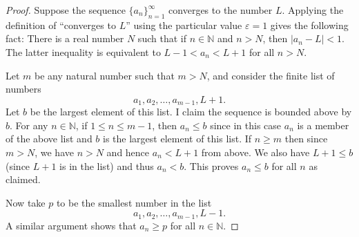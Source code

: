 \documentclass[12pt]{amsart}
\def\e{\varepsilon}
\newcommand{\N}{\mathbb{N}}
\numberwithin{equation}{section}
\theoremstyle{plain} %
\theoremstyle{definition}
\theoremstyle{remark}
\begin{document}
\begin{proof} Suppose the sequence $\{a_n\}_{n=1}^\infty$ converges to
	the number $L$. Applying the definition of ``converges to $L$'' using the particular value $\e = 1$ gives the following fact:
	There is a real number $N$ such that if $n \in \N$ and $n > N$, then $|a_n -
	L| < 1$. The latter inequality is equivalent to  $L-1 < a_n < L+1$
	for all $n > N$.
	
	Let $m$ be any natural number such that $m > N$,
	and consider the finite list of numbers
	$$
	a_1, a_2, \dots, a_{m-1}, L + 1.
	$$
	Let $b$ be the largest element of this list. I claim the sequence is bounded above by $b$.
	For any $n \in  \N$, if $1 \leq n \leq m-1$, then $a_n \leq b$ since in this case $a_n$ is a member of the above list and $b$ is the largest element of this list.
	If $n \geq m$ then since $m > N$, we have $n > N$ and hence $a_n < L + 1$ from above. We also have $L + 1 \leq b$ (since $L+1$ is in the list) and thus $a_n < b$. 
	This proves $a_n \leq b$ for all $n$ as claimed.
	
	Now take $p$ to be the smallest number in the list
	$$
	a_1, a_2, \dots, a_{m-1}, L - 1.
	$$
	A similar argument shows that $a_n \geq p$ for all $n \in \N$.
\end{proof}
\end{document}
